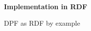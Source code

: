 \documentclass[dvips,slidetop,mathserif,red]{beamer}
\begin{document}
\begin{frame}{}
  \begin{center}
    \begin{Huge}
      \textbf{Implementation in RDF}
    \end{Huge}
  \end{center}
\end{frame}

\begin{frame}[t]{DPF as RDF by example}
\end{frame}
\end{document}
